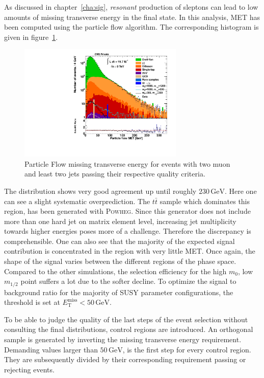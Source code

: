 As discussed in chapter~\ref{cha:sig}, \textit{resonant} production of sleptons can lead to low amounts of missing transverse energy in the final state. In this analysis, MET has been computed using the particle flow algorithm. The corresponding histogram is given in figure~\ref{fig:pfmet}.

\begin{figure}[ht!]
  \centering
    \includegraphics[width=0.7\textwidth]{plots/pfmet.pdf}
  \caption{Particle Flow missing transverse energy for events with two muon and least two jets passing their respective quality criteria.}
  \label{fig:pfmet}
\end{figure}

The distribution shows very good agreement up until roughly $230\,\text{GeV}$. Here one can see a slight systematic overprediction. The $t\bar{t}$ sample which dominates this region, has been generated with \textsc{Powheg}. Since this generator does not include more than one hard jet on matrix element level, increasing jet multiplicity towards higher energies poses more of a challenge. Therefore the discrepancy is comprehensible. One can also see that the majority of the expected signal contribution is concentrated in the region with very little MET. Once again, the shape of the signal varies between the different regions of the phase space. Compared to the other simulations, the selection efficiency for the high $m_0$, low $m_{1/2}$ point suffers a lot due to the softer decline. To optimize the signal to background ratio for the majority of SUSY parameter configurations, the threshold is set at $E^{\text{miss}}_{\text{T}} < 50\,\text{GeV}$.

To be able to judge the quality of the last steps of the event selection without consulting the final distributions, control regions are introduced. An orthogonal sample is generated by inverting the missing transverse energy requirement. Demanding values larger than $50\,\text{GeV}$, is the first step for every control region. They are subsequently divided by their corresponding requirement passing or rejecting events.


